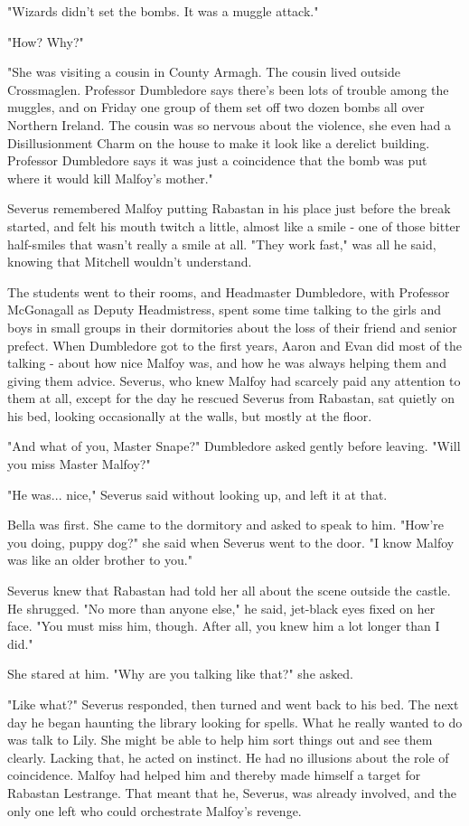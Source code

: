 \documentclass[a4paper,11pt]{article}
\begin{document}
"Wizards didn't set the bombs. It was a muggle attack."

"How? Why?"

"She was visiting a cousin in County Armagh. The cousin lived outside Crossmaglen. Professor Dumbledore says there's been lots of trouble among the muggles, and on Friday one group of them set off two dozen bombs all over Northern Ireland. The cousin was so nervous about the violence, she even had a Disillusionment Charm on the house to make it look like a derelict building. Professor Dumbledore says it was just a coincidence that the bomb was put where it would kill Malfoy's mother."

Severus remembered Malfoy putting Rabastan in his place just before the break started, and felt his mouth twitch a little, almost like a smile - one of those bitter half-smiles that wasn't really a smile at all. "They work fast," was all he said, knowing that Mitchell wouldn't understand.

The students went to their rooms, and Headmaster Dumbledore, with Professor McGonagall as Deputy Headmistress, spent some time talking to the girls and boys in small groups in their dormitories about the loss of their friend and senior prefect. When Dumbledore got to the first years, Aaron and Evan did most of the talking - about how nice Malfoy was, and how he was always helping them and giving them advice. Severus, who knew Malfoy had scarcely paid any attention to them at all, except for the day he rescued Severus from Rabastan, sat quietly on his bed, looking occasionally at the walls, but mostly at the floor.

"And what of you, Master Snape?" Dumbledore asked gently before leaving. "Will you miss Master Malfoy?"

"He was... nice," Severus said without looking up, and left it at that.

Bella was first. She came to the dormitory and asked to speak to him. "How're you doing, puppy dog?" she said when Severus went to the door. "I know Malfoy was like an older brother to you."

Severus knew that Rabastan had told her all about the scene outside the castle. He shrugged. "No more than anyone else," he said, jet-black eyes fixed on her face. "You must miss him, though. After all, you knew him a lot longer than I did."

She stared at him. "Why are you talking like that?" she asked.

"Like what?" Severus responded, then turned and went back to his bed. The next day he began haunting the library looking for spells. What he really wanted to do was talk to Lily. She might be able to help him sort things out and see them clearly. Lacking that, he acted on instinct. He had no illusions about the role of coincidence. Malfoy had helped him and thereby made himself a target for Rabastan Lestrange. That meant that he, Severus, was already involved, and the only one left who could orchestrate Malfoy's revenge.
\end{document}

